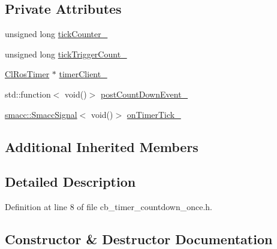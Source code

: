 \subsection*{Private Attributes}
\begin{DoxyCompactItemize}
\item 
unsigned long \hyperlink{classros__timer__client_1_1CbTimerCountdownOnce_a54fbda19dd432efc2a06014bbc88528c}{tick\+Counter\+\_\+}
\item 
unsigned long \hyperlink{classros__timer__client_1_1CbTimerCountdownOnce_a450455322b6158895c709f25a19d464d}{tick\+Trigger\+Count\+\_\+}
\item 
\hyperlink{classros__timer__client_1_1ClRosTimer}{Cl\+Ros\+Timer} $\ast$ \hyperlink{classros__timer__client_1_1CbTimerCountdownOnce_aad83d66fc9be53efdad961a270ec9e22}{timer\+Client\+\_\+}
\item 
std\+::function$<$ void()$>$ \hyperlink{classros__timer__client_1_1CbTimerCountdownOnce_a57712ed15f37200e03a15d0c2e3d05fd}{post\+Count\+Down\+Event\+\_\+}
\item 
\hyperlink{classsmacc_1_1SmaccSignal}{smacc\+::\+Smacc\+Signal}$<$ void()$>$ \hyperlink{classros__timer__client_1_1CbTimerCountdownOnce_a9443c6372da3a1faa917d0e9ae7ebd90}{on\+Timer\+Tick\+\_\+}
\end{DoxyCompactItemize}
\subsection*{Additional Inherited Members}


\subsection{Detailed Description}


Definition at line 8 of file cb\+\_\+timer\+\_\+countdown\+\_\+once.\+h.



\subsection{Constructor \& Destructor Documentation}
